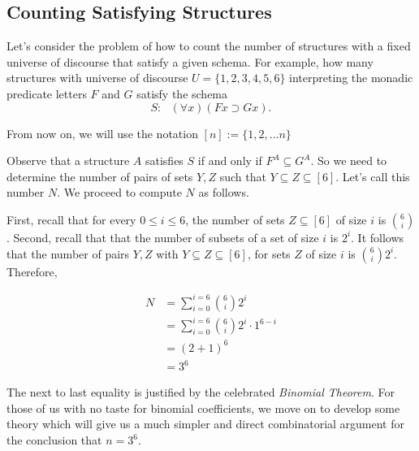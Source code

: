 \subsection{Counting Satisfying Structures}

Let's consider the problem of how to count the number of structures with a fixed universe of discourse that satisfy a given schema. For example, how many structures with universe of discourse $U=\{1,2,3,4,5,6\}$ interpreting the monadic predicate letters $F$ and $G$ satisfy the schema 
\[S:\ \ \ (\forall x)(Fx\supset Gx).\] 

\begin{aside}
    From now on, we will use the notation $[n] := \{1,2,...n\}$
\end{aside}

Observe that a structure $A$ satisfies $S$ if and only if $F^A\subseteq G^A$. So we need to determine the number of pairs of sets $Y,Z$ such that $Y\subseteq Z\subseteq[6]$. Let's call this number $N$. We proceed to compute $N$ as follows.

First, recall that for every $0\leq i\leq 6$, the number of sets $Z\subseteq[6]$ of size $i$ is $\binom{6}{i}$. Second, recall that that the number of subsets of a set of size $i$ is $2^i$. It follows that the number of pairs $Y,Z$ with $Y\subseteq Z\subseteq[6]$, for sets $Z$ of size $i$ is $\binom{6}{i}2^i$. Therefore,

\begin{align*}
    N& = \sum_{i = 0}^{i = 6}\binom{6}{i}2^i \\
    & = \sum_{i = 0}^{i = 6}\binom{6}{i}2^i\cdot 1^{6-i}\\
    &= (2 + 1)^6 \\
    &= 3^6
\end{align*}

The next to last equality is justified by the celebrated \emph{Binomial Theorem}. For those of us with no taste for binomial coefficients, we move on to develop some theory which will give us a much simpler and direct combinatorial argument for the conclusion that $n= 3^6$.


